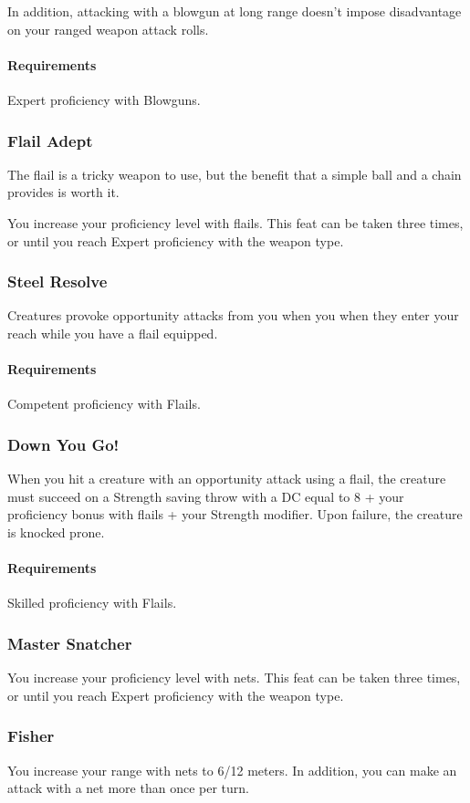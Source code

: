     In addition, attacking with a blowgun at long range doesn't impose disadvantage on your ranged weapon attack rolls.
    \paragraph{Requirements} Expert proficiency with Blowguns.
\subsubsection{Flail Adept} \label{feat::flailadept}
    The flail is a tricky weapon to use, but the benefit that a simple ball and a chain provides is worth it.

    You increase your proficiency level with flails.
    This feat can be taken three times, or until you reach Expert proficiency with the weapon type.
\subsubsection{Steel Resolve} \label{feat::steelresolve}
    Creatures provoke opportunity attacks from you when you when they enter your reach while you have a flail equipped.
    \paragraph{Requirements} Competent proficiency with Flails.
\subsubsection{Down You Go!} \label{feat::downyougo}
    When you hit a creature with an opportunity attack using a flail, the creature must succeed on a Strength saving throw with a DC equal to 8 + your proficiency bonus with flails + your Strength modifier.
    Upon failure, the creature is knocked prone.
    \paragraph{Requirements} Skilled proficiency with Flails.
\subsubsection{Master Snatcher} \label{feat::snatcher}
    You increase your proficiency level with nets.
    This feat can be taken three times, or until you reach Expert proficiency with the weapon type.
\subsubsection{Fisher} \label{feat::fisher}
    You increase your range with nets to 6/12 meters.
    In addition, you can make an attack with a net more than once per turn.
